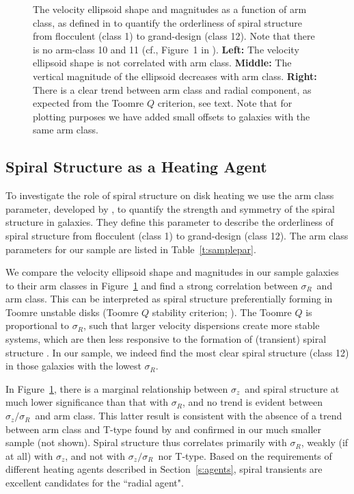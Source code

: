 \documentclass[useAMS,usenatbib]{mn2e}
\newcommand{\sz}{$\sigma_z$}
\newcommand{\sr}{$\sigma_R$}
\newcommand{\szsr}{$\sigma_z/\sigma_R$}
\begin{document}
\begin{figure}
    \centerline{}
   \caption{The velocity ellipsoid shape and magnitudes as a function of
     arm class, as defined in \citet{Elmegreen1987} to quantify the
     orderliness of spiral structure from flocculent (class 1) to
     grand-design (class 12).  Note that there is no arm-class 10 and 11
     (cf., Figure~1 in \citealt{Elmegreen1987}).
     {\bf Left:} The velocity ellipsoid shape is not correlated with arm
     class.  {\bf Middle:} The vertical magnitude of the ellipsoid
     decreases with arm class.  {\bf Right:} There is a clear trend
     between arm class and radial component, as expected from the Toomre
     $Q$ criterion, see text. Note that for plotting purposes we have
     added small offsets to galaxies with the same arm class.
   \label{f:fig8}}
\end{figure}


\subsection{Spiral Structure as a Heating Agent}
\label{sec:armclass}


To investigate the role of spiral structure on disk heating we use the
arm class parameter, developed by \citet{Elmegreen1987}, to quantify the
strength and symmetry of the spiral structure in galaxies.  They define
this parameter to describe the orderliness of spiral structure from
flocculent (class 1) to grand-design (class 12). The arm class
parameters for our sample are listed in Table~\ref{t:samplepar}.

We compare the velocity ellipsoid shape and magnitudes in our sample
galaxies to their arm classes in Figure~\ref{f:fig8} and find a strong
correlation between \sr\ and arm class.  This can be interpreted as
spiral structure preferentially forming in Toomre unstable disks (Toomre
$Q$ stability criterion; \citealt{Toomre1964}).  The Toomre $Q$ is
proportional to \sr, such that larger velocity dispersions create more
stable systems, which are then less responsive to the formation of
(transient) spiral structure \citep[e.g.][]{Binney2012}.  In our sample,
we indeed find the most clear spiral structure (class 12) in those
galaxies with the lowest \sr.

In Figure~\ref{f:fig8}, there is a marginal relationship between
\sz\ and spiral structure at much lower significance than that with \sr,
and no trend is evident between \szsr\ and arm class.  This latter
result is consistent with the absence of a trend between arm class and
T-type found by \citet{Elmegreen1987} and confirmed in our much smaller
sample (not shown).  Spiral structure thus correlates primarily with
\sr, weakly (if at all) with \sz, and not with \szsr\ nor T-type.  Based
on the requirements of different heating agents described in
Section~\ref{s:agents}, spiral transients are excellent candidates for
the ``radial agent".  
\end{document}
